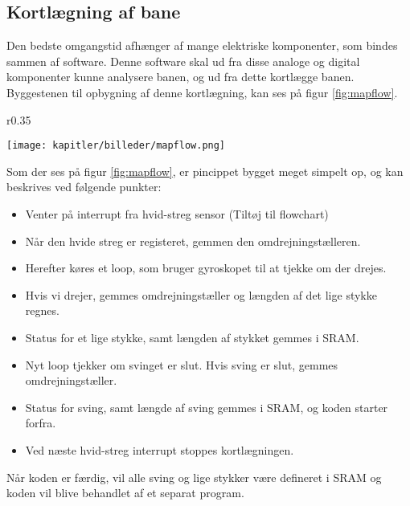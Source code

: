 \newpage
\subsection{Kortlægning af bane}
\label{sub:mapning}
Den bedste omgangstid afhænger af mange elektriske komponenter, som bindes sammen af software.
Denne software skal ud fra disse analoge og digital komponenter kunne analysere banen, og ud fra dette
kortlægge banen. Byggestenen til opbygning af denne kortlægning, kan ses på figur \ref{fig:mapflow}.

\begin{wrapfigure}{r}{0.35\textwidth}
  \vspace{-10pt}
  \begin{center}
      \texttt{[image: kapitler/billeder/mapflow.png]}
    \end{center}
    \vspace{-10pt}
    \caption{Viser grundstenene af koden til kortlægning af banen.}
    \label{fig:mapflow}
\end{wrapfigure}

Som der ses på figur \ref{fig:mapflow}, er pincippet bygget meget simpelt op, og kan beskrives ved følgende punkter:

\begin{itemize}
\item Venter på interrupt fra hvid-streg sensor (Tiltøj til flowchart)
\item Når den hvide streg er registeret, gemmen den omdrejningstælleren.
\item Herefter køres et loop, som bruger gyroskopet til at tjekke om der drejes.
\item Hvis vi drejer, gemmes omdrejningstæller og længden af det lige stykke regnes.
\item Status for et lige stykke, samt længden af stykket gemmes i SRAM.
\item Nyt loop tjekker om svinget er slut. Hvis sving er slut, gemmes omdrejningstæller.
\item Status for sving, samt længde af sving gemmes i SRAM, og koden starter forfra.
\item Ved næste hvid-streg interrupt stoppes kortlægningen.
\end{itemize}

Når koden er færdig, vil alle sving og lige stykker være defineret i SRAM og koden vil blive behandlet
af et separat program.
